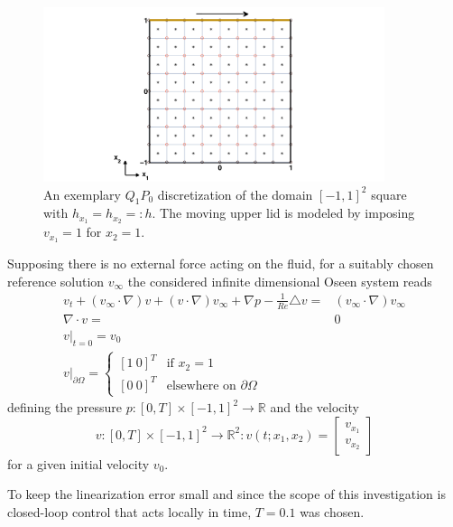 \documentclass[a4paper,10pt,BCOR=15mm]{scrbook}
\begin{document}
\begin{figure}[htbp]
\begin{center}
 \includegraphics[width=10cm]{pics/q1p0/drivcav.pdf}
 \caption{An exemplary $Q_1P_0$ discretization of the domain $[-1,1]^2$ square with $h_{x_1}=h_{x_2}=:h$. The moving upper lid is modeled by imposing $v_{x_1} = 1$ for $ x_2 = 1$.}
 \label{drivcav}
\end{center}
\end{figure}

Supposing there is no external force acting on the fluid, for a suitably chosen reference solution $v_\infty$ the considered infinite dimensional Oseen system reads
\begin{subequations}\label{drivcavos}
\begin{align}
  v_t +  (v_\infty \cdot \nabla) v+(v \cdot \nabla) v_\infty+\nabla p - \frac{1}{Re} \triangle v =&  (v_\infty \cdot \nabla) v_\infty  \\
\nabla \cdot v =& 0 \\
v\lvert _{t=0} =  v_0  \quad \quad \quad\quad \quad \quad\quad \quad \quad\quad ~~ \\
v\lvert_{\partial \Omega} = \begin{cases}[1~0 ]^T&\text{if } x_2 = 1 \\ [0~ 0]^T &\text{elsewhere on $\partial \Omega$} \end{cases}
\end{align}
\end{subequations}
defining the pressure $p:[0,T] \times [-1,1]^2 \rightarrow \mathbb R$ and the velocity
\begin{equation*}
 v:[0,T] \times [-1,1]^2 \rightarrow \mathbb R ^2:v(t;x_1,x_2)=\begin{bmatrix} v_{x_1} \\ v_{x_2} \end{bmatrix}
\end{equation*}
for a given initial velocity $v_0$.

To keep the linearization error small and since the scope of this investigation is closed-loop control that acts locally in time, $T=0.1$ was chosen. 
\end{document}
